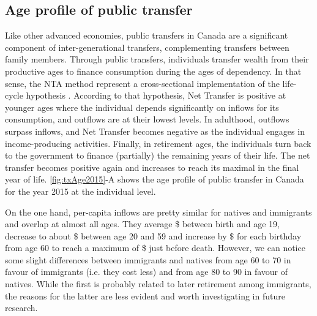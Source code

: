 \subsection{Age profile of public transfer}
Like other advanced economies, public transfers in Canada are a significant component of inter-generational transfers, complementing transfers between family members.
Through public transfers, individuals transfer wealth from their productive ages to finance consumption during the ages of dependency.
In that sense, the NTA method represent a cross-sectional implementation of the life-cycle hypothesis \citep{Ando:1963ea,Deaton:2005vr}.
According to that hypothesis, Net Transfer is positive at younger ages where the individual depends significantly on inflows for its consumption, and outflows are at their lowest levels.
In adulthood, outflows surpass inflows, and Net Transfer becomes negative as the individual engages in income-producing activities.
Finally, in retirement ages, the individuals turn back to the government to finance (partially) the remaining years of their life.
The net transfer becomes positive again and increases to reach its maximal in the final year of life. \autoref{fig:txAge2015}-A shows the age profile of public transfer in Canada for the year 2015 at the individual level.

\vspace{0.7em}\par
On the one hand, per-capita inflows are pretty similar for natives and immigrants and overlap at almost all ages.
They average \$ between birth and age 19, decrease to about \$ between age 20 and 59 and increase by \$ for each birthday from age 60 to reach a maximum of \$ just before death.
However, we can notice some slight differences between immigrants and natives from age 60 to 70 in favour of immigrants (i.e. they cost less) and from age 80 to 90 in favour of natives.
While the first is probably related to later retirement among immigrants, the reasons for the latter are less evident and worth investigating in future research.

